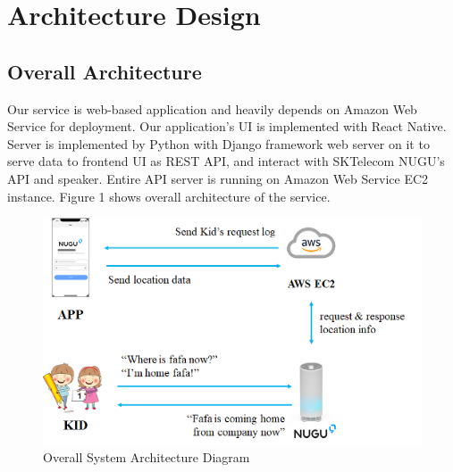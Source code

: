 \documentclass[conference]{IEEEtran}
\begin{document}
\section{Architecture Design}
\subsection{Overall Architecture}
Our service is web-based application and heavily depends on Amazon Web Service for deployment. Our application’s UI is implemented with React Native. Server is implemented by Python with Django framework web server on it to serve data to frontend UI as REST API, and interact with SKTelecom NUGU’s API and speaker. Entire API server is running on Amazon Web Service EC2 instance. Figure 1 shows overall architecture of the service.

\begin{figure}
    \centering
    \includegraphics{images/figure5.png}
    \caption{Overall System Architecture Diagram}
\end{figure}
\end{document}
